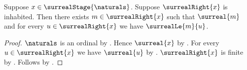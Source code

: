 \begin{corollary}\label{finite_surreal_right_minimum}
    Suppose $x\in\surrealStage{\naturals}$.
    Suppose $\surrealRight{x}$ is inhabited.
    Then there exists $m\in\surrealRight{x}$ such that $\surreal{m}$ and
        for every $u\in\surrealRight{x}$ we have $\surrealLe{m}{u}$.
\end{corollary}
\begin{proof}
    $\naturals$ is an ordinal by .
    Hence $\surreal{x}$ by .
    For every $u\in\surrealRight{x}$ we have $\surreal{u}$
        by .
    $\surrealRight{x}$ is finite by .
    Follows by .
\end{proof}
